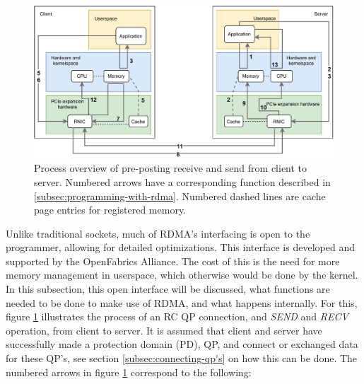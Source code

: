 \begin{figure}
    \centering
    \includegraphics[width=\columnwidth]{figures/PDF/RDAM_SEND_RECV_drawing}
    \caption[Process overview of \textit{SEND} and \textit{RECV}.]{Process overview of pre-posting receive and send from client to server. Numbered arrows have a corresponding function described in \ref{subsec:programming-with-rdma}. Numbered dashed lines are cache page entries for registered memory.}
    \label{fig:send_recv_drawing}
\end{figure}

Unlike traditional sockets, much of RDMA's interfacing is open to the programmer, allowing for detailed optimizations.
This interface is developed and supported by the OpenFabrics Alliance\cite{openfab}.
The cost of this is the need for more memory management in userspace, which otherwise would be done by the kernel.
In this subsection, this open interface will be discussed, what functions are needed to be done to make use of RDMA, and what happens internally.
For this, figure \ref{fig:send_recv_drawing} illustrates the process of an RC QP connection, and \textit{SEND} and \textit{RECV} operation, from client to server.
It is assumed that client and server have successfully made a protection domain (PD), QP, and connect or exchanged data for these QP's, see section \ref{subsec:connecting-qp's} on how this can be done.
The numbered arrows in figure \ref{fig:send_recv_drawing} correspond to the following:

